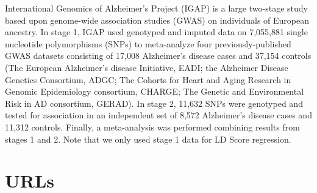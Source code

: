 \documentclass[11pt]{article}
\begin{document}
International Genomics of Alzheimer's Project (IGAP) is a large two-stage study based upon genome-wide association studies (GWAS) on individuals of European ancestry. 
In stage 1, IGAP used genotyped and imputed data on 7,055,881 single nucleotide polymorphisms (SNPs) to meta-analyze four previously-published GWAS datasets consisting of 17,008 Alzheimer's disease cases and 37,154 controls 
(The European Alzheimer's disease Initiative, EADI; the Alzheimer Disease Genetics Consortium, ADGC; The Cohorts for Heart and Aging Research in Genomic Epidemiology consortium, CHARGE; The Genetic and Environmental Risk in AD consortium, GERAD). 
In stage 2, 11,632 SNPs were genotyped and tested for association in an independent set of 8,572 Alzheimer's disease cases and 11,312 controls. 
Finally, a meta-analysis was performed combining results from stages 1 and 2.
Note that we only used stage 1 data for LD Score regression.

\newpage



\section{URLs}\label{URLs}
\end{document}
